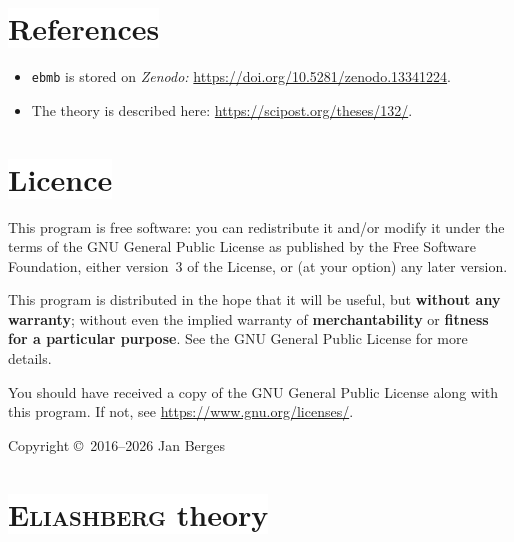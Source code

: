 \documentclass[a4paper]{article}
\def\headline#1{\section*{%
   \normalsize\normalfont%
   \rlap{\rule[0.5ex]\textwidth{0.4pt}}%
   \qquad\colorbox{white}{#1}%
   }}
\begin{document}
   \headline{References}

   \begin{itemize}[itemsep=0pt]
      \item
         \texttt{ebmb} is stored on \textit{Zenodo:}
         \url{https://doi.org/10.5281/zenodo.13341224}.
      \item
         The theory is described here:
         \url{https://scipost.org/theses/132/}.
   \end{itemize}

   \headline{Licence}

   This program is free software: you can redistribute it and/or modify it under
   the terms of the GNU General Public License as published by the Free Software
   Foundation, either version~3 of the License, or (at your option) any later
   version.

   This program is distributed in the hope that it will be useful, but
   \textbf{without any warranty}; without even the implied warranty of
   \textbf{merchantability} or \textbf{fitness for a particular purpose}.
   See the GNU General Public License for more details.

   You should have received a copy of the GNU General Public License along with
   this program. If not, see \url{https://www.gnu.org/licenses/}.

   \bigskip

   Copyright \copyright~2016--2026 Jan Berges

   \headline{\textsc{Eliashberg} theory}
\end{document}

